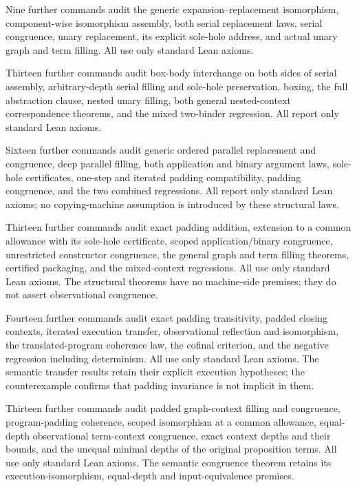 Nine further commands audit the generic expansion--replacement isomorphism,
component-wise isomorphism assembly, both serial replacement laws, serial
congruence, unary replacement, its explicit sole-hole address, and actual
unary graph and term filling. All use only standard Lean axioms.


Thirteen further commands audit box-body interchange on both sides of serial
assembly, arbitrary-depth serial filling and sole-hole preservation, boxing,
the full abstraction clause, nested unary filling, both general nested-context
correspondence theorems, and the mixed two-binder regression. All report only
standard Lean axioms.


Sixteen further commands audit generic ordered parallel replacement and
congruence, deep parallel filling, both application and binary argument laws,
sole-hole certificates, one-step and iterated padding compatibility, padding
congruence, and the two combined regressions. All report only standard Lean
axioms; no copying-machine assumption is introduced by these structural laws.


Thirteen further commands audit exact padding addition, extension to a common
allowance with its sole-hole certificate, scoped application/binary congruence,
unrestricted constructor congruence, the general graph and term filling
theorems, certified packaging, and the mixed-context regressions. All use only
standard Lean axioms. The structural theorems have no machine-side premises;
they do not assert observational congruence.


Fourteen further commands audit exact padding transitivity, padded closing
contexts, iterated execution transfer, observational reflection and isomorphism,
the translated-program coherence law, the cofinal criterion, and the negative
regression including determinism. All use only standard Lean axioms. The
semantic transfer results retain their explicit execution hypotheses; the
counterexample confirms that padding invariance is not implicit in them.


Thirteen further commands audit padded graph-context filling and congruence,
program-padding coherence, scoped isomorphism at a common allowance,
equal-depth observational term-context congruence, exact context depths and
their bounds, and the unequal minimal depths of the original proposition terms.
All use only standard Lean axioms. The semantic congruence theorem retains
its execution-isomorphism, equal-depth and input-equivalence premises.


